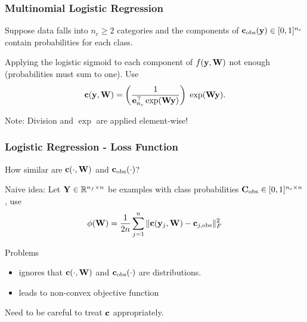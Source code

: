 \documentclass[12pt,fleqn,handout]{beamer}
\begin{document}
\begin{frame}
	\frametitle{Multinomial Logistic Regression}
	
	Suppose data falls into $n_c\geq 2$ categories and the components of ${\bf c}_{\rm obs}({\bf y}) \in[0,1]^{n_c}$ contain probabilities for each class. 
	
	\bigskip
	 
	Applying the logistic sigmoid to each component of $f({\bf y},{\bf W})$ not enough (probabilities must sum to one). Use
	$$
		{\bf c}({\bf y},{\bf W}) = \left( \frac{1}{{\bf e}_{n_c}^\top\exp({\bf W}{\bf y})} \right) \; \exp({\bf W}{\bf y}).
	$$
	
	\bigskip
	
	Note: Division and $\exp$ are applied element-wise!
	
\end{frame}
\begin{frame}
	\frametitle{Logistic Regression - Loss Function}
	
	How similar are ${\bf c}(\cdot,{\bf W})$ and ${\bf c}_{\rm obs}(\cdot)$?
	
\bigskip

	Naive idea: Let ${\bf Y} \in \mathbb{R}^{n_f\times n}$ be examples with class probabilities ${\bf C}_{\rm obs} \in [0,1]^{n_c\times n}$, use 
	$$
	\phi({\bf W})= \frac{1}{2n} \sum_{j=1}^n\|{\bf c}({\bf y}_j,{\bf W}) - {\bf c}_{j,{\rm obs}} \|_F^2
	$$

Problems
\begin{itemize}
	\item ignores that ${\bf c}(\cdot,{\bf W})$ and ${\bf c}_{\rm obs}(\cdot)$ are distributions.
	\item leads to non-convex objective function
\end{itemize} 

\bigskip

Need to be careful to treat ${\bf c}$ appropriately. 	
	
\end{frame}
\end{document}
